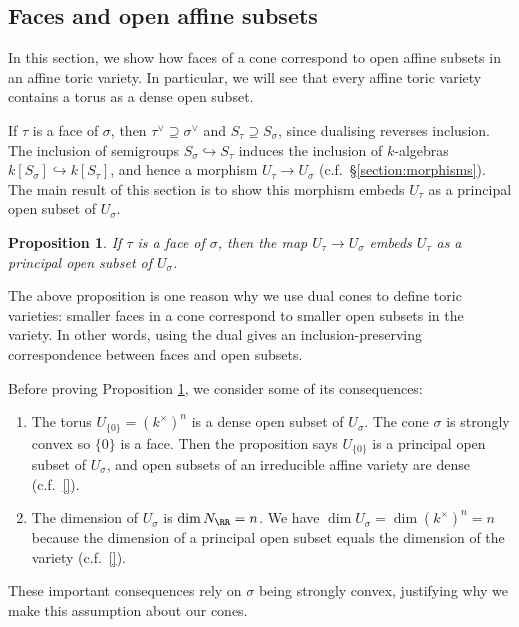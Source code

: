 \documentclass[12pt]{amsart}
\theoremstyle{plain}
\newtheorem{proposition}[theorem]{Proposition}
\begin{document}
\subsection{Faces and open affine subsets}\label{section:facesandopenaffinesubsets}
In this section, we show how faces of a cone correspond to open affine subsets in an affine toric variety.
In particular, we will see that every affine toric variety contains a torus as a dense open subset.

If $\tau$ is a face of $\sigma$, then $\tau^\vee \supseteq \sigma^\vee$ and $S_\tau \supseteq S_\sigma$, since dualising reverses inclusion.
The inclusion of semigroups $S_\sigma \hookrightarrow S_\tau$ induces the inclusion of $k$-algebras $k[S_\sigma] \hookrightarrow k[S_\tau]$, and hence a morphism $U_\tau \to U_\sigma$ (c.f.\ \S \ref{section:morphisms}).
The main result of this section is to show this morphism embeds $U_\tau$ as a principal open subset of $U_\sigma$.

\begin{proposition}\label{proposition:facesopensubsets}
If $\tau$ is a face of $\sigma$, then the map $U_\tau \to U_\sigma$ embeds $U_\tau$ as a principal open subset of $U_\sigma$.
\end{proposition}

The above proposition is one reason why we use dual cones to define toric varieties: smaller faces in a cone correspond to smaller open subsets in the variety.
In other words, using the dual gives an inclusion-preserving correspondence between faces and open subsets.

Before proving Proposition \ref{proposition:facesopensubsets}, we consider some of its consequences:
\begin{enumerate}
\item The torus $U_{\{0\}} = (k^\times)^n$ is a dense open subset of $U_\sigma$. The cone $\sigma$ is strongly convex so $\{0\}$ is a face. Then the proposition says $U_{\{0\}}$ is a principal open subset of $U_\sigma$, and open subsets of an irreducible affine variety are dense (c.f.\ \ref{}).
\item The dimension of $U_\sigma$ is $\dim N_\RR = n$. We have $\dim U_\sigma = \dim (k^\times)^n = n$ because the dimension of a principal open subset equals the dimension of the variety (c.f.\ \ref{}).
\end{enumerate}
\noindent These important consequences rely on $\sigma$ being strongly convex, justifying why we make this assumption about our cones.
\end{document}

